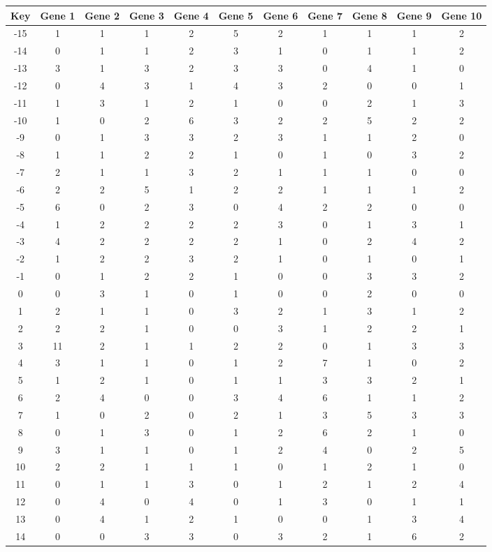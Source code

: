 \begin{tabular}{|c|c|c|c|c|c|c|c|c|c|c|}
\hline
Key & Gene 1 & Gene 2 & Gene 3 & Gene 4 & Gene 5 & Gene 6 & Gene 7 & Gene 8 & Gene 9 & Gene 10 \\
\hline
-15 & 1 & 1 & 1 & 2 & 5 & 2 & 1 & 1 & 1 & 2 \\
-14 & 0 & 1 & 1 & 2 & 3 & 1 & 0 & 1 & 1 & 2 \\
-13 & 3 & 1 & 3 & 2 & 3 & 3 & 0 & 4 & 1 & 0 \\
-12 & 0 & 4 & 3 & 1 & 4 & 3 & 2 & 0 & 0 & 1 \\
-11 & 1 & 3 & 1 & 2 & 1 & 0 & 0 & 2 & 1 & 3 \\
-10 & 1 & 0 & 2 & 6 & 3 & 2 & 2 & 5 & 2 & 2 \\
-9 & 0 & 1 & 3 & 3 & 2 & 3 & 1 & 1 & 2 & 0 \\
-8 & 1 & 1 & 2 & 2 & 1 & 0 & 1 & 0 & 3 & 2 \\
-7 & 2 & 1 & 1 & 3 & 2 & 1 & 1 & 1 & 0 & 0 \\
-6 & 2 & 2 & 5 & 1 & 2 & 2 & 1 & 1 & 1 & 2 \\
-5 & 6 & 0 & 2 & 3 & 0 & 4 & 2 & 2 & 0 & 0 \\
-4 & 1 & 2 & 2 & 2 & 2 & 3 & 0 & 1 & 3 & 1 \\
-3 & 4 & 2 & 2 & 2 & 2 & 1 & 0 & 2 & 4 & 2 \\
-2 & 1 & 2 & 2 & 3 & 2 & 1 & 0 & 1 & 0 & 1 \\
-1 & 0 & 1 & 2 & 2 & 1 & 0 & 0 & 3 & 3 & 2 \\
0 & 0 & 3 & 1 & 0 & 1 & 0 & 0 & 2 & 0 & 0 \\
1 & 2 & 1 & 1 & 0 & 3 & 2 & 1 & 3 & 1 & 2 \\
2 & 2 & 2 & 1 & 0 & 0 & 3 & 1 & 2 & 2 & 1 \\
3 & 11 & 2 & 1 & 1 & 2 & 2 & 0 & 1 & 3 & 3 \\
4 & 3 & 1 & 1 & 0 & 1 & 2 & 7 & 1 & 0 & 2 \\
5 & 1 & 2 & 1 & 0 & 1 & 1 & 3 & 3 & 2 & 1 \\
6 & 2 & 4 & 0 & 0 & 3 & 4 & 6 & 1 & 1 & 2 \\
7 & 1 & 0 & 2 & 0 & 2 & 1 & 3 & 5 & 3 & 3 \\
8 & 0 & 1 & 3 & 0 & 1 & 2 & 6 & 2 & 1 & 0 \\
9 & 3 & 1 & 1 & 0 & 1 & 2 & 4 & 0 & 2 & 5 \\
10 & 2 & 2 & 1 & 1 & 1 & 0 & 1 & 2 & 1 & 0 \\
11 & 0 & 1 & 1 & 3 & 0 & 1 & 2 & 1 & 2 & 4 \\
12 & 0 & 4 & 0 & 4 & 0 & 1 & 3 & 0 & 1 & 1 \\
13 & 0 & 4 & 1 & 2 & 1 & 0 & 0 & 1 & 3 & 4 \\
14 & 0 & 0 & 3 & 3 & 0 & 3 & 2 & 1 & 6 & 2 \\
\hline
\end{tabular}